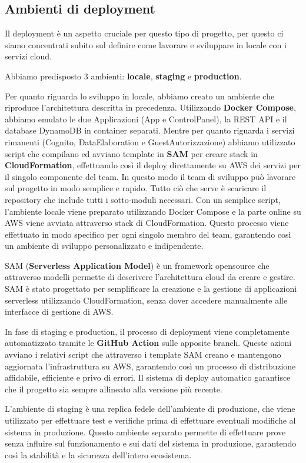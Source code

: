 \subsection{Ambienti di deployment}

Il deployment è un aspetto cruciale per questo tipo di progetto, per questo ci siamo concentrati subito sul definire come lavorare e sviluppare in locale con i servizi cloud.

Abbiamo predisposto 3 ambienti: \textbf{locale}, \textbf{staging} e \textbf{production}.

Per quanto riguarda lo sviluppo in locale, abbiamo creato un ambiente che riproduce l'architettura descritta in precedenza. 
Utilizzando \textbf{Docker Compose}, abbiamo emulato le due Applicazioni (App e ControlPanel), la REST API e il database DynamoDB in container separati. Mentre per quanto riguarda i servizi rimanenti (Cognito, DataElaboration e GuestAutorizzazione) abbiamo utilizzato script che compilano ed avviano template in \textbf{SAM} per creare stack in \textbf{CloudFormation}, effettuando così il deploy direttamente su AWS dei servizi per il singolo componente del team. 
In questo modo il team di sviluppo può lavorare sul progetto in modo semplice e rapido. Tutto ciò che serve è scaricare il repository che include tutti i sotto-moduli necessari. Con un semplice script, l'ambiente locale viene preparato utilizzando Docker Compose e la parte online su AWS viene avviata attraverso stack di CloudFormation. Questo processo viene effettuato in modo specifico per ogni singolo membro del team, garantendo così un ambiente di sviluppo personalizzato e indipendente.

SAM (\textbf{Serverless Application Model}) è un framework opensource che attraverso modelli permette di descrivere l'architettura cloud da creare e gestire. SAM è stato progettato per semplificare la creazione e la gestione di applicazioni serverless utilizzando CloudFormation, senza dover accedere manualmente alle interfacce di gestione di AWS.

In fase di staging e production, il processo di deployment viene completamente automatizzato tramite le \textbf{GitHub Action} sulle apposite branch. Queste azioni avviano i relativi script che attraverso i template SAM creano e mantengono aggiornata l'infrastruttura su AWS, garantendo così un processo di distribuzione affidabile, efficiente e privo di errori. Il sistema di deploy automatico garantisce che il progetto sia sempre allineato alla versione più recente.

L'ambiente di staging è una replica fedele dell'ambiente di produzione, che viene utilizzato per effettuare test e verifiche prima di effettuare eventuali modifiche al sistema in produzione. Questo ambiente separato permette di effettuare prove senza influire sul funzionamento e sui dati del sistema in produzione, garantendo così la stabilità e la sicurezza dell'intero ecosistema.

\newpage